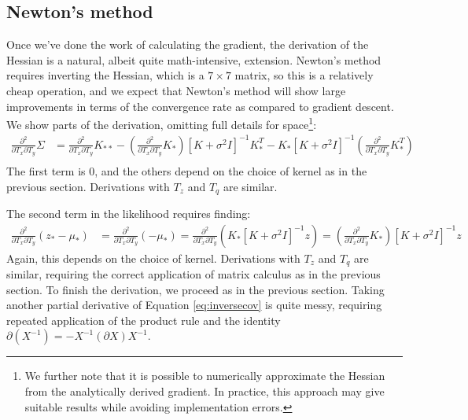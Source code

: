 \documentclass{article} %
\begin{document}
\subsection{Newton's method}
\label{sec:newton}
Once we've done the work of calculating the gradient, the derivation of the Hessian is a natural, albeit quite math-intensive, extension. Newton's method requires inverting the Hessian, which is a $7 \times 7$ matrix, so this is a relatively cheap operation, and we expect that Newton's method will show large improvements in terms of the convergence rate as compared to gradient descent. We show parts of the derivation, omitting full details for space\footnote{We further note that it is possible to numerically approximate the Hessian from the analytically derived gradient. In practice, this approach may give suitable results while avoiding implementation errors.}:
\begin{align*}
\frac{\partial^2 }{\partial T_x \partial T_y} \Sigma &= \frac{\partial^2}{\partial T_x \partial T_y} K_{**} - \left(\frac{\partial^2}{\partial T_x \partial T_y}K_{*}\right) [K + \sigma^2 I]^{-1} K_*^T - K_{*} [K + \sigma^2 I]^{-1} \left(\frac{\partial^2}{\partial T_x \partial T_y} K_*^T\right) \\
\end{align*}
The first term is 0, and the others depend on the choice of kernel as in the previous section. Derivations with $T_z$ and $T_q$ are similar.

The second term in the likelihood requires finding:
\begin{align*}
\frac{\partial^2 }{\partial T_x \partial T_y} (z_* - \mu_*) &= \frac{\partial^2 }{\partial T_x \partial T_y} (- \mu_*) 
= \frac{\partial^2 }{\partial T_x \partial T_y}( K_* [K+\sigma^2 I]^{-1} z)
= (\frac{\partial^2 }{\partial T_x \partial T_y} K_*) [K+\sigma^2 I]^{-1} z
\end{align*}
Again, this depends on the choice of kernel. Derivations with $T_z$ and $T_q$ are similar, requiring the correct application of matrix calculus as in the previous section. To finish the derivation, we proceed as in the previous section. Taking another partial derivative of Equation \ref{eq:inversecov} is quite messy, requiring repeated application of the product rule and the identity  $\partial(X^{-1}) = - X^{-1} (\partial X) X^{-1}$.
\end{document}
